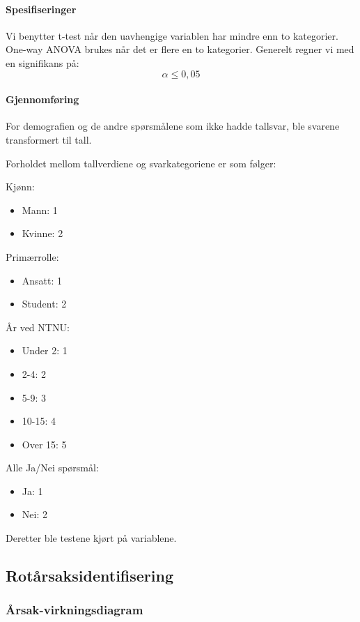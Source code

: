 \paragraph{Spesifiseringer}
Vi benytter t-test når den uavhengige variablen har mindre enn to kategorier. One-way ANOVA brukes når det er flere en to kategorier. Generelt regner vi med en signifikans på: \[\alpha \le 0,05\]

\paragraph{Gjennomføring}
For demografien og de andre spørsmålene som ikke hadde tallsvar, ble svarene transformert til tall. 

Forholdet mellom tallverdiene og svarkategoriene er som følger:

Kjønn:
\begin{itemize}
    \item Mann: 1
    \item Kvinne: 2
\end{itemize}

Primærrolle:
\begin{itemize}
    \item Ansatt: 1
    \item Student: 2
\end{itemize}

År ved NTNU:
\begin{itemize}
    \item Under 2: 1
    \item 2-4: 2
    \item 5-9: 3
    \item 10-15: 4
    \item Over 15: 5
\end{itemize}

Alle Ja/Nei spørsmål:
\begin{itemize}
    \item Ja: 1
    \item Nei: 2
\end{itemize}

Deretter ble testene kjørt på variablene. 


\subsection{Rotårsaksidentifisering}

\subsubsection{Årsak-virkningsdiagram}

